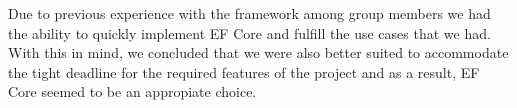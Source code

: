 Due to previous experience with the framework among group members we had the ability to quickly implement EF Core and fulfill the use cases that we had. With this in mind, we concluded that we were also better suited to accommodate the tight deadline for the required features of the \knox{} project and as a result, EF Core seemed to be an appropiate choice.


